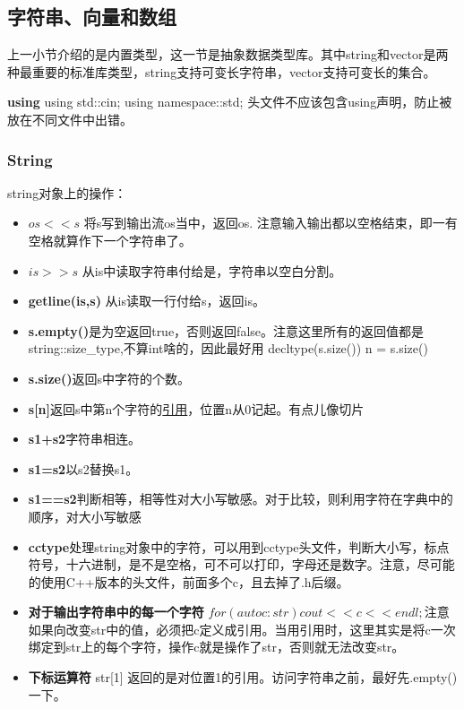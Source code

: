 \subsection{字符串、向量和数组}
上一小节介绍的是内置类型，这一节是抽象数据类型库。其中string和vector是两种最重要的标准库类型，string支持可变长字符串，vector支持可变长的集合。

\textbf{using} using std::cin; using namespace::std; 头文件不应该包含using声明，防止被放在不同文件中出错。

\subsubsection{String}
string对象上的操作：
\begin{itemize}
	\item \textbf{$os << s$} 将s写到输出流os当中，返回os. 注意输入输出都以空格结束，即一有空格就算作下一个字符串了。
	\item \textbf{$is >> s$} 从is中读取字符串付给是，字符串以空白分割。
	\item \textbf{getline(is,s)} 从is读取一行付给s，返回is。
	\item \textbf{s.empty()}是为空返回true，否则返回false。注意这里所有的返回值都是string::size\_type,不算int啥的，因此最好用 decltype(s.size()) n = s.size()
	\item \textbf{s.size()}返回s中字符的个数。
	\item \textbf{s[n]}返回s中第n个字符的\underline{引用}，位置n从0记起。有点儿像切片
	\item \textbf{s1+s2}字符串相连。
	\item \textbf{s1=s2}以s2替换s1。
	\item \textbf{s1==s2}判断相等，相等性对大小写敏感。对于比较，则利用字符在字典中的顺序，对大小写敏感
	\item \textbf{cctype}处理string对象中的字符，可以用到cctype头文件，判断大小写，标点符号，十六进制，是不是空格，可不可以打印，字母还是数字。注意，尽可能的使用C++版本的头文件，前面多个c，且去掉了.h后缀。
	\item \textbf{对于输出字符串中的每一个字符} $for(auto c : str) cout << c <<endl;$注意如果向改变str中的值，必须把c定义成引用。当用引用时，这里其实是将c一次绑定到str上的每个字符，操作c就是操作了str，否则就无法改变str。
	\item \textbf{下标运算符} str[1] 返回的是对位置1的引用。访问字符串之前，最好先.empty()一下。
\end{itemize}

